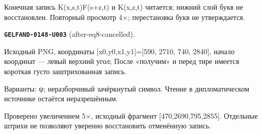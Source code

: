 \documentclass[11pt]{article}
\theoremstyle{definition}
\theoremstyle{remark}
\begin{document}
Конечная запись K(x,s,t)F(s+z,t) и K(x,z,t) читается; нижний слой букв не восстановлен. Повторный просмотр 4×; перестановка букв не утверждается.\par\medskip
\noindent\leavevmode{}\label{GELFAND-P001359:after-eq8-cancelled:note}\textbf{\texttt{GELFAND-0148-U003}} (after-eq8-cancelled).\par\nopagebreak[4]
Исходный PNG, координаты [x0,y0,x1,y1]=[590, 2710, 740, 2840], начало координат — левый верхний угол; После «получим» и перед тире имеется короткая густо заштрихованная запись.\par
Варианты: ψ; неразборчивый зачёркнутый символ. Чтение в дипломатическом источнике остаётся неразрешённым.\par
Проверено увеличением 5×, исходный фрагмент [470,2690,795,2855]. Отдельные штрихи не позволяют уверенно восстановить отменённую запись.\par\medskip
\end{document}
